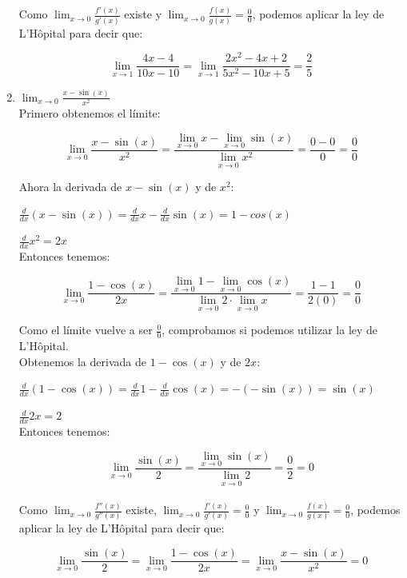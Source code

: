 \documentclass[12pt]{article}
\begin{document}
\begin{enumerate}[\hspace{9px} a)]
        Como \(\displaystyle\lim_{x \to 0}\frac{f'(x)}{g'(x)}\) existe y \(\displaystyle\lim_{x \to 0}\frac{f(x)}{g(x)}=\frac{0}{0}\), podemos aplicar la ley de L'H\^opital para decir que:
        
        \[\displaystyle\lim_{x \to 1}\frac{4x-4}{10x-10}=\lim_{x \to 1}\frac{2x^2-4x+2}{5x^2-10x+5}=\frac{2}{5}\]

    \item \(\displaystyle\lim_{x \to 0}\frac{x-\sin(x)}{x^2}\)\\
    
        Primero obtenemos el l\'imite:

        \[\displaystyle\lim_{x \to 0}\frac{x-\sin(x)}{x^2} = \frac{\displaystyle\lim_{x \to 0}x - \lim_{x \to 0}\sin(x)}{\displaystyle\lim_{x \to 0}x^2}=\frac{0-0}{0}=\frac{0}{0}\]

        Ahora la derivada de $x-\sin(x)$ y de $x^2$:

        \(\displaystyle\frac{d}{dx}(x-\sin(x))=\frac{d}{dx}x-\frac{d}{dx}\sin(x)=1-cos(x)\)

        \(\displaystyle\frac{d}{dx}x^2=2x\)\\

        Entonces tenemos:

        \[\displaystyle\lim_{x \to 0}\frac{1-\cos(x)}{2x}=\frac{\displaystyle\lim_{x \to 0}1 - \lim_{x \to 0}\cos(x)}{\lim_{x \to 0}2 \cdot \lim_{x \to 0}x} = \frac{1-1}{2(0)}=\frac{0}{0}\]

        Como el l\'imite vuelve a ser $\displaystyle\frac{0}{0}$, comprobamos si podemos utilizar la ley de L'H\^opital.\\

        Obtenemos la derivada de $1-\cos(x)$ y de $2x$:

        \(\displaystyle\frac{d}{dx}(1-\cos(x)) = \frac{d}{dx}1 - \frac{d}{dx}\cos(x) = -(-\sin(x)) = \sin(x)\)

        \(\displaystyle\frac{d}{dx}2x = 2\)\\

        Entonces tenemos:

        \[\displaystyle\lim_{x \to 0}\frac{\sin(x)}{2} = \frac{\displaystyle\lim_{x \to 0}\sin(x)}{\displaystyle\lim_{x \to 0}2} = \frac{0}{2} = 0\]\\

        Como \(\displaystyle\lim_{x \to 0}\frac{f''(x)}{g''(x)}\) existe, \(\displaystyle\lim_{x \to 0}\frac{f'(x)}{g'(x)}=\frac{0}{0}\) y \(\displaystyle\lim_{x \to 0}\frac{f(x)}{g(x)}=\frac{0}{0}\), podemos aplicar la ley de L'H\^opital para decir que:

        \[\displaystyle\lim_{x \to 0}\frac{\sin(x)}{2} = \lim_{x \to 0}\frac{1-\cos(x)}{2x} = \lim_{x \to 0}\frac{x-\sin(x)}{x^2}= 0\]\\

\end{enumerate}
\end{document}
